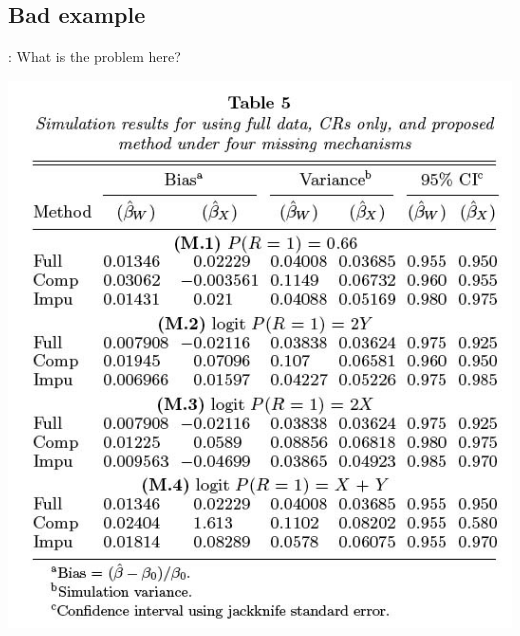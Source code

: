 \subsection{Bad example}
\begin{frame}{\secname: \subsecname}
What is the problem here? \\
\begin{center}
\includegraphics[scale=0.35]{image/paik_tab5}
\end{center}
\end{frame}

